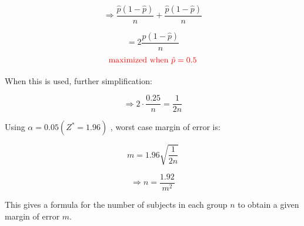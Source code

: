 \documentclass[14pt]{extarticle}
\begin{document}
\[
\Rightarrow \frac{\hat{p}(1 - \hat{p})}{n} + \frac{\hat{p}(1 - \hat{p})}{n}
\]

\[
= 2 \frac{\hat{p}(1 - \hat{p})}{n}
\]
\[
\textcolor{red}{\text{maximized when } \hat{p} = 0.5}
\]

When this is used, further simplification:

\[
\Rightarrow 2 \cdot \frac{0.25}{n} = \frac{1}{2n}
\]

Using $\alpha = 0.05 \left( Z^* = 1.96 \right)$ , worst case margin of error is:

\[
m = 1.96 \sqrt{\frac{1}{2n}}
\]

\[
\Rightarrow n = \frac{1.92}{m^2}
\]

This gives a formula for the number of subjects in each group \(n\) to obtain a given margin of error \(m\).
\end{document}
